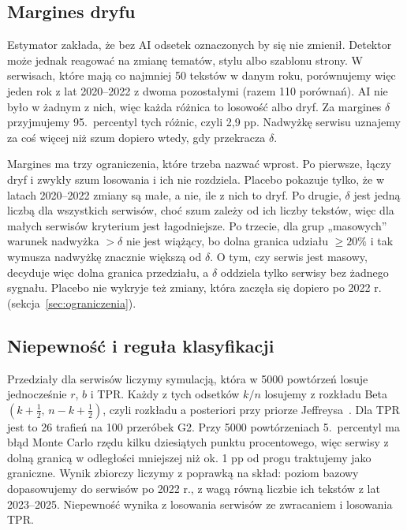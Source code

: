 \documentclass[11pt,a4paper]{article}
\begin{document}
\subsection{Margines dryfu}\label{sec:dryf}

Estymator zakłada, że bez AI odsetek oznaczonych by się nie zmienił. Detektor może jednak reagować na zmianę tematów, stylu albo szablonu strony. W serwisach, które mają co najmniej 50 tekstów w danym roku, porównujemy więc jeden rok z lat 2020--2022 z dwoma pozostałymi (razem 110 porównań). AI nie było w żadnym z nich, więc każda różnica to losowość albo dryf. Za margines $\delta$ przyjmujemy 95.\ percentyl tych różnic, czyli 2,9 pp. Nadwyżkę serwisu uznajemy za coś więcej niż szum dopiero wtedy, gdy przekracza $\delta$.

Margines ma trzy ograniczenia, które trzeba nazwać wprost. Po pierwsze, łączy dryf i zwykły szum losowania i ich nie rozdziela. Placebo pokazuje tylko, że w latach 2020--2022 zmiany są małe, a nie, ile z nich to dryf. Po drugie, $\delta$ jest jedną liczbą dla wszystkich serwisów, choć szum zależy od ich liczby tekstów, więc dla małych serwisów kryterium jest łagodniejsze. Po trzecie, dla grup „masowych” warunek nadwyżka $>\delta$ nie jest wiążący, bo dolna granica udziału $\geq 20\%$ i tak wymusza nadwyżkę znacznie większą od $\delta$. O tym, czy serwis jest masowy, decyduje więc dolna granica przedziału, a $\delta$ oddziela tylko serwisy bez żadnego sygnału. Placebo nie wykryje też zmiany, która zaczęła się dopiero po 2022 r. (sekcja~\ref{sec:ograniczenia}).

\subsection{Niepewność i reguła klasyfikacji}\label{sec:niepewnosc}

Przedziały dla serwisów liczymy symulacją, która w 5000 powtórzeń losuje jednocześnie $r$, $b$ i TPR. Każdy z tych odsetków $k/n$ losujemy z rozkładu Beta$(k+\tfrac12,\,n-k+\tfrac12)$, czyli rozkładu a posteriori przy priorze Jeffreysa~\cite{brown2001}. Dla TPR jest to 26 trafień na 100 przeróbek G2. Przy 5000 powtórzeniach 5.\ percentyl ma błąd Monte Carlo rzędu kilku dziesiątych punktu procentowego, więc serwisy z dolną granicą w odległości mniejszej niż ok. 1 pp od progu traktujemy jako graniczne. Wynik zbiorczy liczymy z poprawką na skład: poziom bazowy dopasowujemy do serwisów po 2022 r., z wagą równą liczbie ich tekstów z lat 2023--2025. Niepewność wynika z losowania serwisów ze zwracaniem i losowania TPR.
\end{document}
